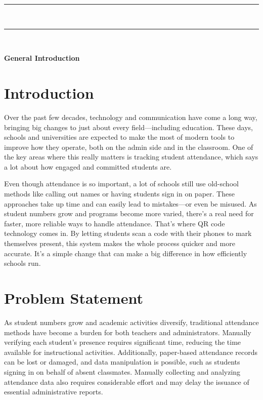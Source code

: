 \documentclass[12pt,a4paper]{report}
\begin{document}
\begin{center}
    {\color{mintgreen} \rule{0.8\textwidth}{1.5pt} }\\[0.3cm]
    {\color{mintgreen} \rule{\textwidth}{2pt} }
\end{center}


\
\newpage
\vspace{0.3cm}
\begin{tcolorbox}[
    colback=mintgreen!20, 
    colframe=mintgreen!80!black, 
    width=\textwidth, 
    boxrule=1pt, 
    arc=5pt, 
    auto outer arc,
    left=10pt,
    right=10pt,
    top=6pt,
    bottom=6pt
]
    \centering
    \Large \textbf{General Introduction}
\end{tcolorbox}



\section{Introduction}

\indent Over the past few decades, technology and communication have come a long way, bringing big changes to just about every field—including education. These days, schools and universities are expected to make the most of modern tools to improve how they operate, both on the admin side and in the classroom. One of the key areas where this really matters is tracking student attendance, which says a lot about how engaged and committed students are.

Even though attendance is so important, a lot of schools still use old-school methods like calling out names or having students sign in on paper. These approaches take up time and can easily lead to mistakes—or even be misused. As student numbers grow and programs become more varied, there's a real need for faster, more reliable ways to handle attendance. That’s where QR code technology comes in. By letting students scan a code with their phones to mark themselves present, this system makes the whole process quicker and more accurate. It’s a simple change that can make a big difference in how efficiently schools run.

\section{Problem Statement}
As student numbers grow and academic activities diversify, traditional attendance methods have become a burden for both teachers and administrators. Manually verifying each student's presence requires significant time, reducing the time available for instructional activities. Additionally, paper-based attendance records can be lost or damaged, and data manipulation is possible, such as students signing in on behalf of absent classmates. Manually collecting and analyzing attendance data also requires considerable effort and may delay the issuance of essential administrative reports.
\end{document}
